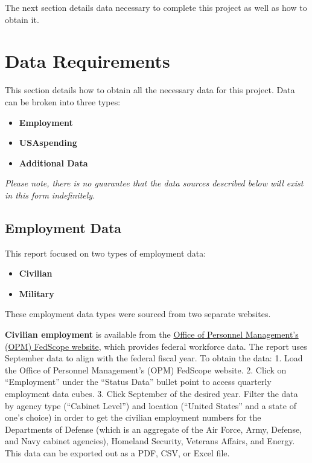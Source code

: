 \documentclass[
]{book}
\providecommand{\tightlist}{%
  \setlength{\itemsep}{0pt}\setlength{\parskip}{0pt}}
\begin{document}
The next section details data necessary to complete this project as well as how to obtain it.

\hypertarget{data}{%
\chapter{Data Requirements}\label{data}}

This section details how to obtain all the necessary data for this project. Data can be broken into three types:

\begin{itemize}
\tightlist
\item
  \textbf{Employment}
\item
  \textbf{USAspending}
\item
  \textbf{Additional Data}
\end{itemize}

\emph{Please note, there is no guarantee that the data sources described below will exist in this form indefinitely.}

\hypertarget{employ}{%
\section{Employment Data}\label{employ}}

This report focused on two types of employment data:

\begin{itemize}
\tightlist
\item
  \textbf{Civilian}\\
\item
  \textbf{Military}
\end{itemize}

These employment data types were sourced from two separate websites.

\textbf{Civilian employment} is available from the \href{https://www.fedscope.opm.gov/}{Office of Personnel Management's (OPM) FedScope website}, which provides federal workforce data. The report uses September data to align with the federal fiscal year. To obtain the data:
1. Load the Office of Personnel Management's (OPM) FedScope website.
2. Click on ``Employment'' under the ``Status Data'' bullet point to access quarterly employment data cubes. 3. Click September of the desired year.
Filter the data by agency type (``Cabinet Level'') and location (``United States'' and a state of one's choice) in order to get the civilian employment numbers for the Departments of Defense (which is an aggregate of the Air Force, Army, Defense, and Navy cabinet agencies), Homeland Security, Veterans Affairs, and Energy. This data can be exported out as a PDF, CSV, or Excel file.
\end{document}

